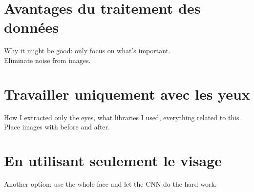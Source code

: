 \section{Avantages du traitement des données}
Why it might be good: only focus on what's important.\\
Eliminate noise from images.\\

\section{Travailler uniquement avec les yeux}
How I extracted only the eyes, what libraries I used, everything related to this.\\
Place images with before and after.\\

\section{En utilisant seulement le visage}
Another option: use the whole face and let the CNN do the hard work.\\

